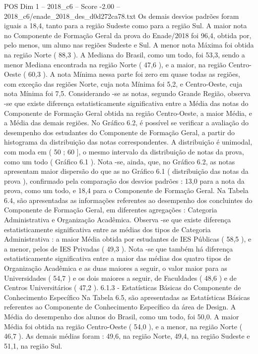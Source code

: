 \begin{textsample}{POS Dim 1 – 2018\_c6 – Score -2.00 – 2018\_c6/enade\_2018\_des\_d0d272ca78.txt}
Os demais desvios padrões foram iguais a 18,4, tanto para a região Sudeste como para a região Sul.
A maior nota no Componente de Formação Geral da prova do Enade/2018 foi 96,4, obtida por, pelo menos, um aluno nas regiões Sudeste e Sul.
A menor nota Máxima foi obtida na região Norte ( 88,3 ).
A Mediana do Brasil, como um todo, foi 53,3, sendo a menor Mediana encontrada na região Norte ( 47,6 ), e a maior, na região Centro-Oeste ( 60,3 ).
A nota Mínima nessa parte foi zero em quase todas as regiões, com exceção das regiões Norte, cuja nota Mínima foi 5,2, e Centro-Oeste, cuja nota Mínima foi 7,5.
Considerando -se as notas, segundo Grande Região, observa -se que existe diferença estatisticamente significativa entre a Média das notas do Componente de Formação Geral obtida na região Centro-Oeste, a maior Média, e a Média das demais regiões.
No Gráfico 6.2, é possível se verificar a avaliação do desempenho dos estudantes do Componente de Formação Geral, a partir do histograma da distribuição das notas correspondentes.
A distribuição é unimodal, com moda em ( 50 ; 60 ], o mesmo intervalo da distribuição de notas da prova, como um todo ( Gráfico 6.1 ).
Nota -se, ainda, que, no Gráfico 6.2, as notas apresentam maior dispersão do que as no Gráfico 6.1 ( distribuição das notas da prova ), confirmado pela comparação dos desvios padrões : 13,0 para a nota da prova, como um todo, e 18,4 para o Componente de Formação Geral.
Na Tabela 6.4, são apresentadas as informações referentes ao desempenho dos concluintes do Componente de Formação Geral, em diferentes agregações : Categoria Administrativa e Organização Acadêmica.
Observa -se que existe diferença estatisticamente significativa entre as médias dos tipos de Categoria Administrativa : a maior Média obtida por estudantes de IES Públicas ( 58,5 ), e a menor, pelos de IES Privadas ( 49,3 ).
Nota -se que também há diferença estatisticamente significativa entre a maior das médias dos quatro tipos de Organização Acadêmica e as duas maiores a seguir, o valor maior para as Universidades ( 54,7 ) e os dois maiores a seguir, de Faculdades ( 48,6 ) e de Centros Universitários ( 47,2 ). 6.1.3 - Estatísticas Básicas do Componente de Conhecimento Específico Na Tabela 6.5, são apresentadas as Estatísticas Básicas referentes ao Componente de Conhecimento Específico da área de Design.
A Média do desempenho dos alunos do Brasil, como um todo, foi 50,0.
A maior Média foi obtida na região Centro-Oeste ( 54,0 ), e a menor, na região Norte ( 46,7 ).
As demais médias foram : 49,6, na região Norte, 49,4, na região Sudeste e 51,1, na região Sul.

\end{textsample}
